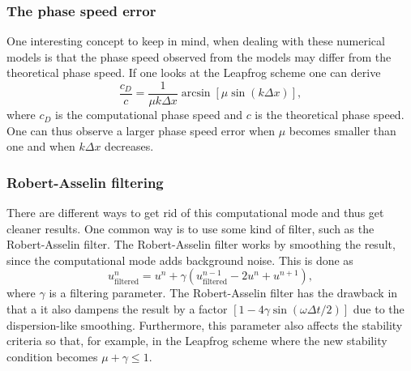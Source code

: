 \subsubsection{The phase speed error}
One interesting concept to keep in mind, when dealing with these numerical models is that the phase speed observed from the models may differ from the theoretical phase speed. If one looks at the Leapfrog scheme one can derive 
\begin{equation}
    \frac{c_D}{c}=\frac{1}{\mu k\Delta x } \arcsin\left[\mu\sin(k\Delta x)\right],
    \label{eq:phasespeed}
\end{equation}
where $c_D$ is the computational phase speed and $c$ is the theoretical phase speed. One can thus observe a larger phase speed error when $\mu$ becomes smaller than one and when $k\Delta x$ decreases. 

\subsubsection{Robert-Asselin filtering}
There are different ways to get rid of this computational mode and thus get cleaner results. One common way is to use some kind of filter, such as the Robert-Asselin filter. The Robert-Asselin filter works by smoothing the result, since the computational mode adds background noise. This is done as
\begin{equation}
    u_\text{filtered}^n=u^n+\gamma\left(u_\text{filtered}^{n-1}-2u^n+u^{n+1}\right),
\end{equation}
where $\gamma$ is a filtering parameter. The Robert-Asselin filter has the drawback in that a it also dampens the result by a factor $\left[1-4\gamma\sin(\omega\Delta t / 2)\right]$ due to the dispersion-like smoothing. Furthermore, this parameter also affects the stability criteria so that, for example, in the Leapfrog scheme where the new stability condition becomes $\mu+\gamma\leq1$. 